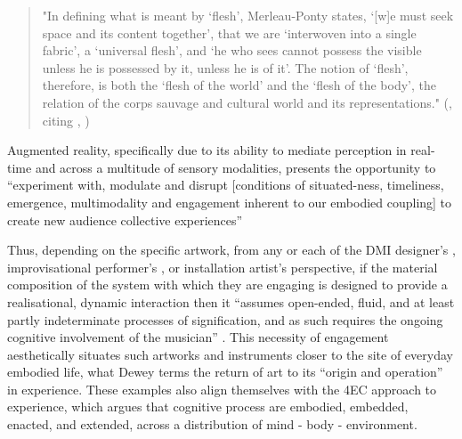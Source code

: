 \begin{quote}
    "In defining what is meant by ‘flesh’, Merleau-Ponty states, ‘[w]e must seek space and its content together’, that we are ‘interwoven into a single fabric’, a ‘universal flesh’, and ‘he who sees cannot possess the visible unless he is possessed by it, unless he is of it’. The notion of ‘flesh’, therefore, is both the ‘flesh of the world’ and the ‘flesh of the body’, the relation of the corps sauvage and cultural world and its representations." (\citeauthor{chevalier2018}, \citeyear{chevalier2018}  citing \citeauthor{merleau-ponty1945}, \citeyear{merleau-ponty1945,merleau-ponty1968})
\end{quote}
Augmented reality, specifically due to its ability to mediate perception in real-time and across a multitude of sensory modalities, presents the opportunity to “experiment with, modulate and disrupt [conditions of situated-ness, timeliness, emergence, multimodality and engagement inherent to our embodied coupling] to create new audience collective experiences” \citep[]{chevalier2018}

Thus, depending on the specific artwork, from any or each of the DMI designer’s \citep[]{essl2006,armstrong2006}, improvisational performer’s \citep[]{hayes2019}, or installation artist’s \citep[]{chevalier2018} perspective, if the material composition of the system with which they are engaging is designed to provide a realisational, dynamic interaction then it “assumes open-ended, fluid, and at least partly indeterminate processes of signification, and as such requires the ongoing cognitive involvement of the musician” \citep[p. 48]{armstrong2006}. This necessity of engagement aesthetically situates such artworks and instruments closer to the site of everyday embodied life, what Dewey terms the return of art to its “origin and operation” in experience. These examples also align themselves with the 4EC approach to experience, which argues that cognitive process are embodied, embedded, enacted, and extended, across a distribution of mind - body - environment. 

